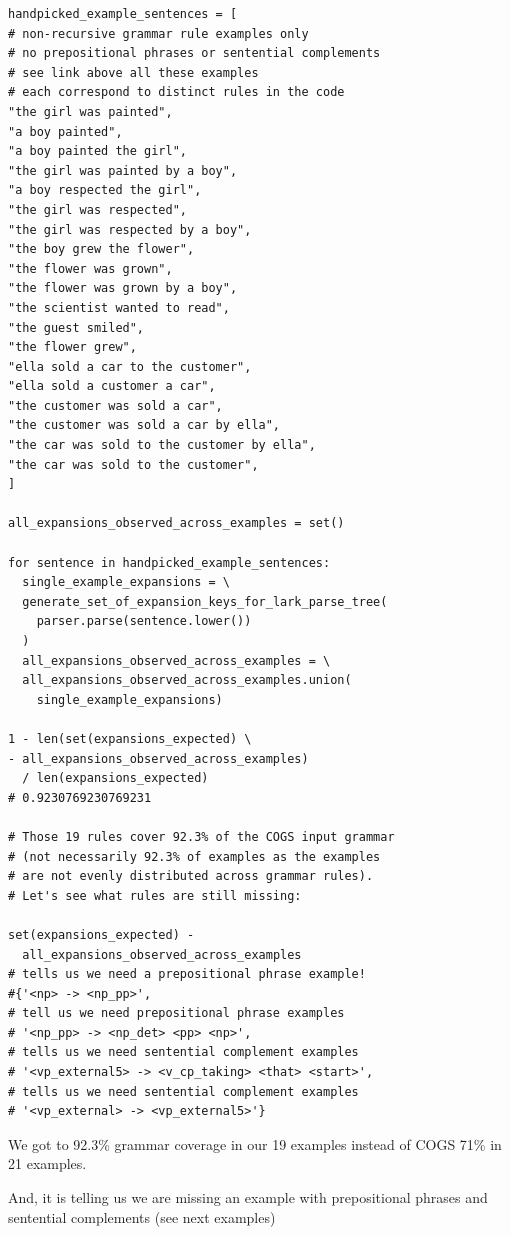 \documentclass[11pt]{article}
\begin{document}
\begin{tiny}
\begin{verbatim}
handpicked_example_sentences = [ 
# non-recursive grammar rule examples only
# no prepositional phrases or sentential complements
# see link above all these examples 
# each correspond to distinct rules in the code
"the girl was painted",
"a boy painted",
"a boy painted the girl",
"the girl was painted by a boy",
"a boy respected the girl", 
"the girl was respected",
"the girl was respected by a boy",
"the boy grew the flower",
"the flower was grown",
"the flower was grown by a boy",
"the scientist wanted to read",
"the guest smiled",
"the flower grew",
"ella sold a car to the customer",
"ella sold a customer a car",
"the customer was sold a car",
"the customer was sold a car by ella",
"the car was sold to the customer by ella",
"the car was sold to the customer",
]

all_expansions_observed_across_examples = set()

for sentence in handpicked_example_sentences:
  single_example_expansions = \
  generate_set_of_expansion_keys_for_lark_parse_tree(
    parser.parse(sentence.lower())
  )
  all_expansions_observed_across_examples = \
  all_expansions_observed_across_examples.union(
    single_example_expansions)

1 - len(set(expansions_expected) \
- all_expansions_observed_across_examples) 
  / len(expansions_expected)
# 0.9230769230769231

# Those 19 rules cover 92.3% of the COGS input grammar
# (not necessarily 92.3% of examples as the examples 
# are not evenly distributed across grammar rules).
# Let's see what rules are still missing:

set(expansions_expected) - 
  all_expansions_observed_across_examples
# tells us we need a prepositional phrase example!
#{'<np> -> <np_pp>',
# tell us we need prepositional phrase examples
# '<np_pp> -> <np_det> <pp> <np>',
# tells us we need sentential complement examples
# '<vp_external5> -> <v_cp_taking> <that> <start>',
# tells us we need sentential complement examples
# '<vp_external> -> <vp_external5>'}
\end{verbatim}
\end{tiny}

We got to 92.3\% grammar coverage in our 19 examples instead of COGS 71\% in 21 examples.

And, it is telling us we are missing an example with prepositional phrases and sentential complements (see next examples)
\end{document}
